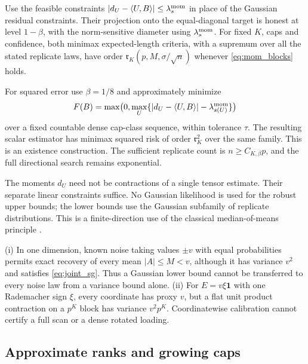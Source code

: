 \begin{theorem}\label{thm:mom_full}
Use the feasible constraints
$|d_U-\langle U,B\rangle|\le\lambda_s^{\rm mom}$ in place of the Gaussian residual constraints. Their projection onto the equal-diagonal target is honest at level $1-\beta$, with the norm-sensitive diameter using $\lambda_s^{\rm mom}$. For fixed $K$, caps and confidence, both minimax expected-length criteria, with a supremum over all the stated replicate laws, have order $\mathfrak r_K(p,M,\sigma/\sqrt n)$ whenever \eqref{eq:mom_blocks} holds.

For squared error use $\beta=1/8$ and approximately minimize
\[
 F(B)=\max\bigl(0,\max_U\{|d_U-\langle U,B\rangle|-\lambda_{s(U)}^{\rm mom}\}\bigr)
\]
over a fixed countable dense cap-class sequence, within tolerance $\tau$. The resulting scalar estimator has minimax squared risk of order $\mathfrak r_K^2$ over the same family. This is an existence construction. The sufficient replicate count is $n\ge C_{K,\beta}p$, and the full directional search remains exponential.
\end{theorem}

The moments $d_U$ need not be contractions of a single tensor estimate. Their separate linear constraints suffice. No Gaussian likelihood is used for the robust upper bounds; the lower bounds use the Gaussian subfamily of replicate distributions. This is a finite-direction use of the classical median-of-means principle \citep{devroye2016}.

\begin{proposition}\label{prop:noise_limits}
(i) In one dimension, known noise taking values $\pm v$ with equal probabilities permits exact recovery of every mean $|A|\le M<v$, although it has variance $v^2$ and satisfies \eqref{eq:joint_sg}. Thus a Gaussian lower bound cannot be transferred to every noise law from a variance bound alone.
(ii) For $E=v\xi\mathbf1$ with one Rademacher sign $\xi$, every coordinate has proxy $v$, but a flat unit product contraction on a $p^K$ block has variance $v^2p^K$. Coordinatewise calibration cannot certify a full scan or a dense rotated loading.
\end{proposition}

\subsection{Approximate ranks and growing caps}

